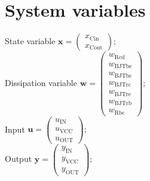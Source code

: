 \documentclass[11pt, oneside]{article}      %
\begin{document}
\section{System variables}
%
State variable $ \mathbf{x} = \left(\begin{array}{c}x_{\mathrm{Cin}}\\x_{\mathrm{Cout}}\end{array}\right) ; $ 
%
\\
%
Dissipation variable $ \mathbf{w} = \left(\begin{array}{c}w_{\mathrm{Rcd}}\\w_{\mathrm{BJTbe}}\\w_{\mathrm{BJTbc}}\\w_{\mathrm{BJTrc}}\\w_{\mathrm{BJTre}}\\w_{\mathrm{BJTrb}}\\w_{\mathrm{Rbc}}\end{array}\right) ; $ 
%
\\
%
Input $ \mathbf{u} = \left(\begin{array}{c}u_{\mathrm{IN}}\\u_{\mathrm{VCC}}\\u_{\mathrm{OUT}}\end{array}\right) ; $ 
%
\\
%
Output $ \mathbf{y} = \left(\begin{array}{c}y_{\mathrm{IN}}\\y_{\mathrm{VCC}}\\y_{\mathrm{OUT}}\end{array}\right) ; $ 
%
\\
%
%
\end{document}
